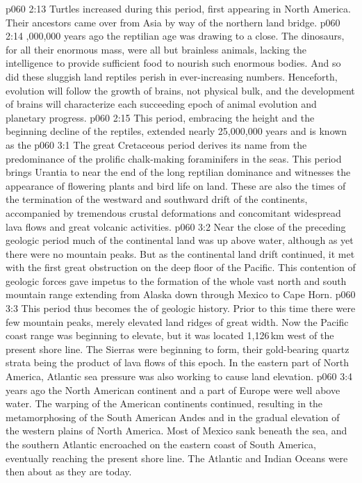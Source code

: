 \vs p060 2:13 Turtles increased during this period, first appearing in North America. Their ancestors came over from Asia by way of the northern land bridge.
\vs p060 2:14 ,000,000 years ago the reptilian age was drawing to a close. The dinosaurs, for all their enormous mass, were all but brainless animals, lacking the intelligence to provide sufficient food to nourish such enormous bodies. And so did these sluggish land reptiles perish in ever\hyp{}increasing numbers. Henceforth, evolution will follow the growth of brains, not physical bulk, and the development of brains will characterize each succeeding epoch of animal evolution and planetary progress.
\vs p060 2:15 \pc This period, embracing the height and the beginning decline of the reptiles, extended nearly 25,000,000 years and is known as the 
\vs p060 3:1 The great Cretaceous period derives its name from the predominance of the prolific chalk\hyp{}making foraminifers in the seas. This period brings Urantia to near the end of the long reptilian dominance and witnesses the appearance of flowering plants and bird life on land. These are also the times of the termination of the westward and southward drift of the continents, accompanied by tremendous crustal deformations and concomitant widespread lava flows and great volcanic activities.
\vs p060 3:2 Near the close of the preceding geologic period much of the continental land was up above water, although as yet there were no mountain peaks. But as the continental land drift continued, it met with the first great obstruction on the deep floor of the Pacific. This contention of geologic forces gave impetus to the formation of the whole vast north and south mountain range extending from Alaska down through Mexico to Cape Horn.
\vs p060 3:3 This period thus becomes the  of geologic history. Prior to this time there were few mountain peaks, merely elevated land ridges of great width. Now the Pacific coast range was beginning to elevate, but it was located 1,126\,km west of the present shore line. The Sierras were beginning to form, their gold\hyp{}bearing quartz strata being the product of lava flows of this epoch. In the eastern part of North America, Atlantic sea pressure was also working to cause land elevation.
\vs p060 3:4 \pc {} years ago the North American continent and a part of Europe were well above water. The warping of the American continents continued, resulting in the metamorphosing of the South American Andes and in the gradual elevation of the western plains of North America. Most of Mexico sank beneath the sea, and the southern Atlantic encroached on the eastern coast of South America, eventually reaching the present shore line. The Atlantic and Indian Oceans were then about as they are today.
